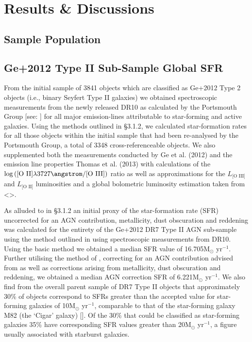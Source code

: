 \section{Results \& Discussions}
\subsection{Sample Population}
\subsection{Ge+2012 Type II Sub-Sample Global SFR}

From the initial sample of 3841 objects which are classified as Ge+2012 Type 2 objects (i.e., binary Seyfert Type II galaxies) we obtained spectroscopic measurements from the newly released DR10 as calculated by the Portsmouth Group [see: \cite{Thomas_2013}] for all major emission-lines attributable to star-forming and active galaxies. Using the methods outlined in §3.1.2, we calculated star-formation rates for all those objects within the initial sample that had been re-analysed by the Portsmouth Group, a total of 3348 cross-referenceable objects. We also supplemented both the measurements conducted by Ge et al. (2012) and the emission line properties Thomas et al. (2013) with calculations of the $\log{(\text{[O II]}{\lambda}3727\angstrom\text{/[O III]})}$ ratio as well as approximations for the $L_{\text{[O III]}}$ and $L_{\text{[O II]}}$ luminosities and a global bolometric luminosity estimation taken from <>.         

As alluded to in §3.1.2 an initial proxy of the star-formation rate (SFR) uncorrected for an AGN contribution, metallicity, dust obscuration and reddening was calculated for the entirety of the Ge+2012 DR7 Type II AGN sub-sample using the method outlined in \cite{Kennicutt_1998} using spectroscopic measurements from DR10. Using the basic \cite{Kennicutt_1998} method we obtained a median SFR value of 16.705M$_{\odot}$ yr$^{-1}$. Further utilising the method of \cite{Kewley_2004}, correcting for an AGN contribution advised from \cite{2006ApJ...642..702K} as well as corrections arising from metallicity, dust obscuration and reddening, we obtained a median AGN correction SFR of 6.221M$_{\odot}$ yr$^{-1}$. We also find from the overall parent sample of DR7 Type II objects that approximately 30\% of objects correspond to SFRs greater than the accepted value for star-forming galaxies of 10M$_{\odot}$ yr$^{-1}$, comparable to that of the star-forming galaxy M82 (the ‘Cigar’ galaxy) [\cite{2009ApJ...706.1364F}]. Of the 30\% that could be classified as star-forming galaxies 35\% have corresponding SFR values greater than 20M$_{\odot}$ yr$^{-1}$, a figure usually associated with starburst galaxies.


